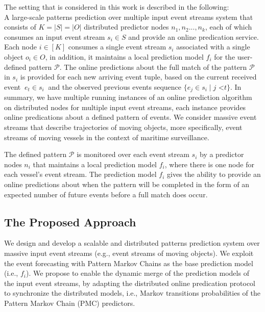 \par The setting that is considered in this work is described in the following:\\
A large-scale patterns prediction over multiple input event streams system that  consists of $K=\left\vert{S}\right\vert=\left\vert{O}\right\vert$ distributed predictor nodes $n_1,n_2...,n_k$, each of which consumes an input event stream $s_i\in S$ and provide an online predication service. Each node $i \in [K]$ consumes a single event stream $s_i$ associated with a single object $o_i \in O$, in addition,  it  maintains a local prediction model $f_i$ for the user-defined pattern $\mathcal{P}$. The online predictions about the full match of  the pattern $\mathcal{P}$ in $s_i$ is provided for each new arriving event tuple, based on the current received event $ \ e_t \in s_i \ $ and the observed previous events sequence $\{e_j \in s_i \mid  j \text{ <} t\}$. In summary, we have multiple running instances of an online prediction algorithm on distributed nodes for multiple input event streams, each instance  provides online predications about a defined pattern of events.  We consider massive event streams that describe trajectories of  moving objects, more specifically, event streams of moving vessels in the context of maritime surveillance.  

The defined pattern $\mathcal{P}$ is monitored over each event stream $s_i$  by a  predictor nodes  $n_i$  that maintains a local prediction model $f_i$, where there is one node for each vessel's event stream.  The prediction model $f_i$ gives the ability to provide an online predictions about when the pattern will be completed in the form of an expected number of future events before a full match does occur.

\subsection{The Proposed Approach}
\par We design and develop a scalable and distributed patterns prediction system over massive input event streams (e.g., event streams of moving objects). We  exploit the event forecasting with Pattern Markov Chains \cite{alevizos2017event} as the base prediction model (i.e., $f_i$). We propose to enable the dynamic merge of the prediction models of the input event streams, by adapting the distributed online predication protocol \cite{kamp2014communication} to synchronize the distributed  models, i.e., Markov transitions probabilities of the Pattern Markov Chain (PMC) predictors.

